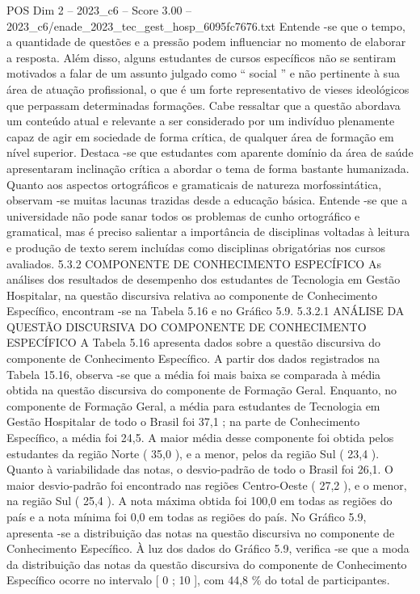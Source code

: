 \begin{textsample}{POS Dim 2 – 2023\_c6 – Score 3.00 – 2023\_c6/enade\_2023\_tec\_gest\_hosp\_6095fc7676.txt}
Entende -se que o tempo, a quantidade de questões e a pressão podem influenciar no momento de elaborar a resposta.
Além disso, alguns estudantes de cursos específicos não se sentiram motivados a falar de um assunto julgado como “ social ” e não pertinente à sua área de atuação profissional, o que é um forte representativo de vieses ideológicos que perpassam determinadas formações.
Cabe ressaltar que a questão abordava um conteúdo atual e relevante a ser considerado por um indivíduo plenamente capaz de agir em sociedade de forma crítica, de qualquer área de formação em nível superior.
Destaca -se que estudantes com aparente domínio da área de saúde apresentaram inclinação crítica a abordar o tema de forma bastante humanizada.
Quanto aos aspectos ortográficos e gramaticais de natureza morfossintática, observam -se muitas lacunas trazidas desde a educação básica.
Entende -se que a universidade não pode sanar todos os problemas de cunho ortográfico e gramatical, mas é preciso salientar a importância de disciplinas voltadas à leitura e produção de texto serem incluídas como disciplinas obrigatórias nos cursos avaliados. 5.3.2 COMPONENTE DE CONHECIMENTO ESPECÍFICO As análises dos resultados de desempenho dos estudantes de Tecnologia em Gestão Hospitalar, na questão discursiva relativa ao componente de Conhecimento Específico, encontram -se na Tabela 5.16 e no Gráfico 5.9. 5.3.2.1 ANÁLISE DA QUESTÃO DISCURSIVA DO COMPONENTE DE CONHECIMENTO ESPECÍFICO A Tabela 5.16 apresenta dados sobre a questão discursiva do componente de Conhecimento Específico.
A partir dos dados registrados na Tabela 15.16, observa -se que a média foi mais baixa se comparada à média obtida na questão discursiva do componente de Formação Geral.
Enquanto, no componente de Formação Geral, a média para estudantes de Tecnologia em Gestão Hospitalar de todo o Brasil foi 37,1 ; na parte de Conhecimento Específico, a média foi 24,5.
A maior média desse componente foi obtida pelos estudantes da região Norte ( 35,0 ), e a menor, pelos da região Sul ( 23,4 ).
Quanto à variabilidade das notas, o desvio-padrão de todo o Brasil foi 26,1.
O maior desvio-padrão foi encontrado nas regiões Centro-Oeste ( 27,2 ), e o menor, na região Sul ( 25,4 ).
A nota máxima obtida foi 100,0 em todas as regiões do país e a nota mínima foi 0,0 em todas as regiões do país.
No Gráfico 5.9, apresenta -se a distribuição das notas na questão discursiva no componente de Conhecimento Específico.
À luz dos dados do Gráfico 5.9, verifica -se que a moda da distribuição das notas da questão discursiva do componente de Conhecimento Específico ocorre no intervalo [ 0 ; 10 ], com 44,8 \% do total de participantes.

\end{textsample}

